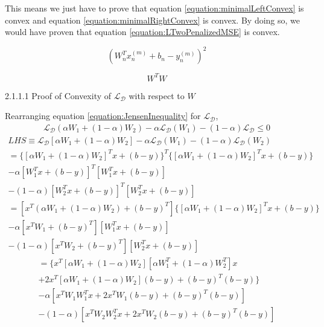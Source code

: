 \documentclass[a4paper,12pt]{article}
\begin{document}
This means we just have to prove that equation \ref{equation:minimalLeftConvex} is convex and equation \ref{equation:minimalRightConvex} is convex. By doing so, we would have proven that equation \ref{equation:LTwoPenalizedMSE} is convex. 

\begin{equation}
\label{equation:minimalLeftConvex}
(W^{T}_{n}x^{(m)}_{n} + b_{n} - y^{(m)}_{n})^{2}
\end{equation}

\begin{equation}
\label{equation:minimalRightConvex}
 W^{T}W
\end{equation}

2.1.1.1 Proof of Convexity of $\mathcal{L_D}$ with respect to $W$

Rearranging equation \ref{equation:JensenInequality} for $\mathcal{L_D}$,
\begin{align}
	\label{equation:Convexivity_ModifiedJensen} \mathcal{L_D}(\alpha W_1 + (1 - \alpha) W_2) - \alpha \mathcal{L_D}(W_1) 
    	- (1 - \alpha) \mathcal{L_D} \leq 0
\end{align}
\begin{multline}
	LHS \equiv \mathcal{L_D}[\alpha W_1 + (1 - \alpha) W_2 ] - 
    	\alpha \mathcal{L_D}(W_1) - (1 - \alpha) \mathcal{L_D}(W_2) \\
        = \{[\alpha W_1 + (1 - \alpha) W_2]^{T} x + (b - y)\}^{T} 
    	\{[\alpha W_1 + (1 - \alpha) W_2]^{T} x + (b - y)\} \\ 
        - \alpha [W_1^{T} x + (b - y)]^{T} [W_1^{T} x + (b - y)] \\
        - (1 -\alpha) [W_2^{T} x + (b - y)]^{T} [W_2^{T} x + (b - y)]
\end{multline}
\begin{multline}
    = [ x^{T} (\alpha W_1 + (1 - \alpha) W_2) + (b -y )^{T}]
    	\{[\alpha W_1 + (1 - \alpha) W_2]^{T} x + (b - y)\} \\
        - \alpha [x^{T} W_1 + (b - y)^{T}] [W_1^{T} x + (b - y)] \\
        - (1 -\alpha) [x^{T} W_2 + (b - y)^{T}] [W_2^{T} x + (b - y)]
\end{multline}
\begin{multline}
    = \{ x^{T} [\alpha W_1 + (1 - \alpha) W_2] [\alpha W_1^{T} + (1 - \alpha) W_2^{T}] x \\
    	+ 2 x^{T} [\alpha W_1 + (1 - \alpha) W_2] (b - y)  + (b - y)^{T} (b - y) \} \\
        - \alpha [ x^{T} W_1 W_1^{T} x + 2 x^{T} W_1 (b - y) + (b - y)^{T} (b - y)] \\
        - (1 - \alpha) [ x^{T} W_2 W_2^{T} x + 2 x^{T} W_2 (b - y) + (b - y)^{T} (b - y)] 
\end{multline}
\end{document}
